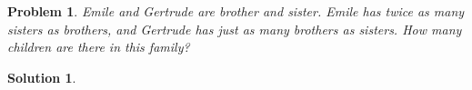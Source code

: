 \documentclass{article}
\newtheorem*{problem}{Problem}
\newtheorem*{solution}{Solution}
\begin{document}
\begin{problem}
Emile and Gertrude are brother and sister. Emile has twice as many sisters as brothers, and Gertrude has just as many brothers as sisters. How many children are there in this family?
\end{problem}

\begin{solution}
\end{solution}
\end{document}

